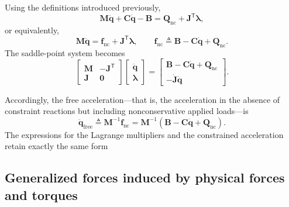 \documentclass{article}
\begin{document}
Using the definitions introduced previously,
\[
\bm M\ddot{\bm q}
+
\bm C\dot{\bm q}
-
\bm B
=
\bm Q_{\mathrm{nc}}
+
\bm J^{\mathsf T}\bm\lambda,
\]
or equivalently,
\begin{equation}
\bm M\ddot{\bm q}
=
\bm f_{\mathrm{nc}}
+
\bm J^{\mathsf T}\bm\lambda,
\qquad
\bm f_{\mathrm{nc}}
\triangleq
\bm B
-
\bm C\dot{\bm q}
+
\bm Q_{\mathrm{nc}}.
\label{eq:forced_mass_matrix_form}
\end{equation}
The saddle-point system becomes
\begin{equation}
\boxed{
\left[
\begin{array}{cc}
\bm M & -\bm J^{\mathsf T} \\
\bm J & \bm 0
\end{array}
\right]
\left[
\begin{array}{c}
\ddot{\bm q} \\
\bm\lambda
\end{array}
\right]
=
\left[
\begin{array}{c}
\bm B-\bm C\dot{\bm q}+\bm Q_{\mathrm{nc}} \\
-\dot{\bm J}\dot{\bm q}
\end{array}
\right].
}
\label{eq:forced_saddle_system}
\end{equation}

Accordingly, the free acceleration---that is, the acceleration in the
absence of constraint reactions but including nonconservative applied
loads---is
\begin{equation}
\ddot{\bm q}_{\mathrm{free}}
\triangleq
\bm M^{-1}\bm f_{\mathrm{nc}}
=
\bm M^{-1}
\left(
\bm B-\bm C\dot{\bm q}+\bm Q_{\mathrm{nc}}
\right).
\label{eq:forced_free_acceleration}
\end{equation}
The expressions for the Lagrange multipliers and the constrained
acceleration retain exactly the same form
\subsection{Generalized forces induced by physical forces and torques}
\end{document}
